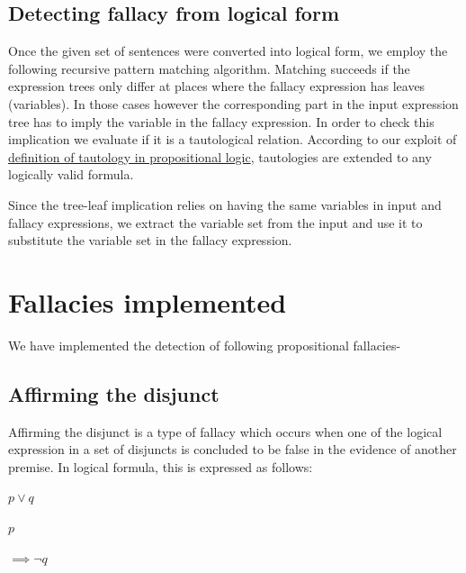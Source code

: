\documentclass[14pt, english]{article}
\begin{document}
\subsection{Detecting fallacy from logical form}
Once the given set of sentences were converted into logical form,
we employ the following recursive pattern matching algorithm. Matching succeeds if the expression trees only differ at places where
the fallacy expression has leaves (variables). In those cases however the corresponding
part in the input expression tree has to imply the variable in the fallacy expression.
In order to check this implication we evaluate if it is a tautological relation. According to our
exploit of \href{http://en.wikipedia.org/wiki/Tautology_(logic)}{definition of tautology in propositional logic},
tautologies are extended to any logically valid formula.

Since the tree-leaf implication relies on having the same variables in input and fallacy expressions,
we extract the variable set from the input and use it to substitute the variable set in the fallacy expression.

\section{Fallacies implemented}

We have implemented the detection of following propositional fallacies-


\subsection{Affirming the disjunct}

Affirming the disjunct is a type of fallacy which occurs when one
of the logical expression in a set of disjuncts is concluded to be
false in the evidence of another premise. In logical formula, this
is expressed as follows:

\begin{center}
$p\vee q$
\par\end{center}

\begin{center}
$p$
\par\end{center}

\begin{center}
$\implies\neg q$
\par\end{center}
\end{document}
